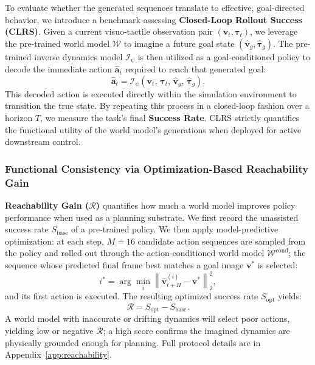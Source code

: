 \documentclass{article}
\begin{document}
To evaluate whether the generated sequences translate to effective, goal-directed behavior, we introduce a benchmark assessing \textbf{Closed-Loop Rollout Success (CLRS)}. Given a current visuo-tactile observation pair $(\mathbf{v}_t, \boldsymbol{\tau}_t)$, we leverage the pre-trained world model $\mathcal{W}$ to imagine a future goal state $(\hat{\mathbf{v}}_{g}, \hat{\boldsymbol{\tau}}_{g})$. The pre-trained inverse dynamics model $\mathcal{I}_\psi$ is then utilized as a goal-conditioned policy to decode the immediate action $\hat{\mathbf{a}}_t$ required to reach that generated goal:
\begin{equation}
    \hat{\mathbf{a}}_t = \mathcal{I}_\psi\!\left(\mathbf{v}_t,\, \boldsymbol{\tau}_t,\, \hat{\mathbf{v}}_{g},\, \hat{\boldsymbol{\tau}}_{g}\right).
\end{equation}
This decoded action is executed directly within the simulation environment to transition the true state. By repeating this process in a closed-loop fashion over a horizon $T$, we measure the task's final \textbf{Success Rate}. CLRS strictly quantifies the functional utility of the world model's generations when deployed for active downstream control.

\subsubsection{Functional Consistency via Optimization-Based Reachability Gain}
\label{method:R}

\textbf{Reachability Gain ($\mathcal{R}$)} quantifies how much a world model improves policy performance when used as a planning substrate. We first record the unassisted success rate $S_{\text{base}}$ of a pre-trained policy. We then apply model-predictive optimization: at each step, $M{=}16$ candidate action sequences are sampled from the policy and rolled out through the action-conditioned world model $\mathcal{W}^{\text{cond}}$; the sequence whose predicted final frame best matches a goal image $\mathbf{v}^*$ is selected:
\begin{equation}
    i^* = \arg\min_{i} \left\| \hat{\mathbf{v}}_{t+H}^{(i)} - \mathbf{v}^* \right\|_2^2,
\end{equation}
and its first action is executed. The resulting optimized success rate $S_{\text{opt}}$ yields:
\begin{equation}
    \mathcal{R} = S_{\text{opt}} - S_{\text{base}}.
\end{equation}
A world model with inaccurate or drifting dynamics will select poor actions, yielding low or negative $\mathcal{R}$; a high score confirms the imagined dynamics are physically grounded enough for planning. Full protocol details are in Appendix~\ref{app:reachability}.
\end{document}
